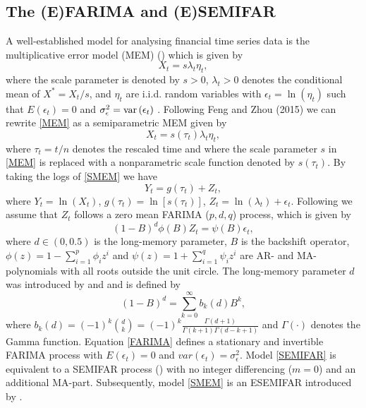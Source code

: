 \documentclass[12pt]{article}
\newcommand{\var}{\mbox{var\,}}
\begin{document}
\subsection{The (E)FARIMA and (E)SEMIFAR}
A well-established model for  analysing financial time series data is the multiplicative error model (MEM) (\cite{engle2002dynamic})  which is given by 
\begin{equation}
\label{MEM}
X_t=s \lambda_t \eta_t,
\end{equation}
where the scale parameter is denoted by $s >0$, $\lambda_t >0$ denotes the conditional mean of $X^*=X_t/s$, and $\eta_t$ are i.i.d. random variables with $\epsilon_t = \ln(\eta_t)$ such that $E(\epsilon_t) = 0$ and $\sigma^2_\epsilon = \var(\epsilon_t)$ . Following Feng and Zhou (2015) we can rewrite \eqref{MEM} as a semiparametric MEM given by
\begin{equation}
\label{SMEM}
X_t=s(\tau_t)\lambda_t \eta_t,
\end{equation}   
where $\tau_t=t/n$ denotes the rescaled time and where the scale parameter $s$ in \eqref{MEM} is replaced with a nonparametric scale function denoted by $s(\tau_t)$. 
By taking the logs of \eqref{SMEM} we have
\begin{equation}
\label{SEMIFAR}
Y_t=g(\tau_t) + Z_t,
\end{equation}
where $Y_t=\ln(X_t)$, $g(\tau_t)=\ln[s(\tau_t)]$, $Z_t=\ln(\lambda_t) + \epsilon_t$.%
Following \citet{beran2002semifar} we assume that $Z_t$ follows a zero mean FARIMA ($p, d, q$) process, which is given by
\begin{equation}
\label{FARIMA}
(1-B)^d\phi(B)Z_t =\psi(B)\epsilon_t,
\end{equation}
where $d \in (0,0.5)$ is the long-memory parameter, $B$ is the backshift operator, $\phi(z)=1-\sum_{i=1}^{p}\phi_iz^i$ and  $\psi(z)=1+\sum_{i=1}^{q}\psi_iz^i$ are AR- and MA-polynomials with all roots outside the unit circle. The long-memory parameter $d$ was introduced by \citet{granger1980introduction} and \citet{hosking1981fractional} and is defined by 
\begin{equation}
	\label{d}
	(1-B)^{d} = \sum_{k=0}^{\infty} b_k(d) B^k, 
\end{equation} 
where $b_k(d) = (-1)^{k}{d\choose k}  = (-1)^{k} \frac{\Gamma(d+1)}{\Gamma(k+1)\Gamma(d-k+1)}$ and $\Gamma(\cdot)$ denotes the Gamma function. Equation \eqref{FARIMA} defines a stationary and invertible FARIMA process with $E(\epsilon_t)=0$ and $var(\epsilon_t)=\sigma^2_{\epsilon}$. Model \eqref{SEMIFAR} is equivalent to a SEMIFAR process (\cite{beran2002semifar}) with no integer differencing ($m=0$) and an additional MA-part.
Subsequently, model \eqref{SMEM} is an ESEMIFAR introduced by \citet{beran2015modelling}.
\end{document}
